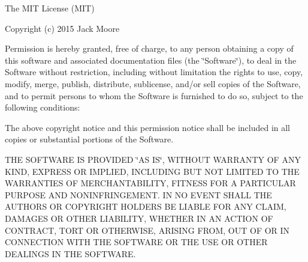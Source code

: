 The MIT License (MIT)

Copyright (c) 2015 Jack Moore

Permission is hereby granted, free of charge, to any person obtaining a copy of this software and associated documentation files (the \char`\"{}\+Software\char`\"{}), to deal in the Software without restriction, including without limitation the rights to use, copy, modify, merge, publish, distribute, sublicense, and/or sell copies of the Software, and to permit persons to whom the Software is furnished to do so, subject to the following conditions\+:

The above copyright notice and this permission notice shall be included in all copies or substantial portions of the Software.

THE SOFTWARE IS PROVIDED \char`\"{}\+AS IS\char`\"{}, WITHOUT WARRANTY OF ANY KIND, EXPRESS OR IMPLIED, INCLUDING BUT NOT LIMITED TO THE WARRANTIES OF MERCHANTABILITY, FITNESS FOR A PARTICULAR PURPOSE AND NONINFRINGEMENT. IN NO EVENT SHALL THE AUTHORS OR COPYRIGHT HOLDERS BE LIABLE FOR ANY CLAIM, DAMAGES OR OTHER LIABILITY, WHETHER IN AN ACTION OF CONTRACT, TORT OR OTHERWISE, ARISING FROM, OUT OF OR IN CONNECTION WITH THE SOFTWARE OR THE USE OR OTHER DEALINGS IN THE SOFTWARE. 